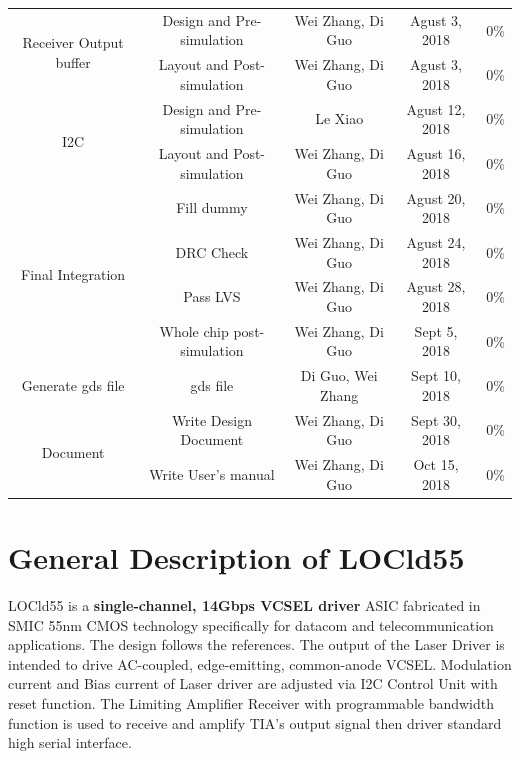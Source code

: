 \documentclass[11pt,a4paper]{article}
\begin{document}
\begin{spacing}{1.25}
\begin{table}[H]
\begin{tabular}{|c|c|c|c|c|}
\hline
\multirow{2}{*}{Receiver Output buffer} & Design and Pre-simulation & Wei Zhang, Di Guo & Agust 3, 2018 & 0\% \\ \cline{2-5}
& Layout and Post-simulation & Wei Zhang, Di Guo & Agust 3, 2018 & 0\% \\
\hline
\multirow{2}{*}{I2C} & Design and Pre-simulation & Le Xiao & Agust 12, 2018 & 0\% \\ \cline{2-5}
& Layout and Post-simulation & Wei Zhang, Di Guo & Agust 16, 2018 & 0\% \\
\hline
\multirow{4}{*}{Final Integration} & Fill dummy & Wei Zhang, Di Guo & Agust 20, 2018 & 0\% \\ \cline{2-5}
& DRC Check & Wei Zhang, Di Guo & Agust 24, 2018 & 0\% \\ \cline{2-5}
& Pass LVS & Wei Zhang, Di Guo & Agust 28, 2018 & 0\% \\ \cline{2-5}
& Whole chip post-simulation & Wei Zhang, Di Guo & Sept 5, 2018 & 0\% \\ 
\hline
Generate gds file & gds file & Di Guo, Wei Zhang& Sept 10, 2018 & 0\% \\
\hline
\multirow{2}{*}{Document} & Write Design Document & Wei Zhang, Di Guo & Sept 30, 2018 & 0\% \\ \cline{2-5}
& Write User's manual & Wei Zhang, Di Guo & Oct 15, 2018 & 0\% \\
\hline

\end{tabular}
\end{table}

\newpage                            %

\section{General Description of LOCld55}    %

LOCld55 is a \textbf{single-channel, 14Gbps VCSEL driver} ASIC fabricated in SMIC 55nm CMOS technology specifically for datacom and telecommunication applications. The design follows the references\cite{ref1}. The output of the Laser Driver is intended to drive AC-coupled, edge-emitting, common-anode VCSEL. Modulation current and Bias current of Laser driver are adjusted via I2C Control Unit with reset function. The Limiting Amplifier Receiver with programmable bandwidth function is used to receive and amplify TIA's output signal then driver standard high serial interface. 


\end{spacing}
\end{document}
